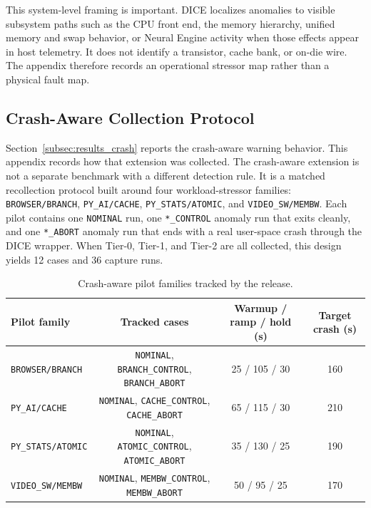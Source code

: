 This system-level framing is important. \textsc{DICE} localizes anomalies to visible subsystem paths such as the CPU front end, the memory hierarchy, unified memory and swap behavior, or Neural Engine activity when those effects appear in host telemetry. It does not identify a transistor, cache bank, or on-die wire. The appendix therefore records an operational stressor map rather than a physical fault map.

\FloatBarrier

\subsection{Crash-Aware Collection Protocol}\label{app:crash_protocol}

Section~\ref{subsec:results_crash} reports the crash-aware warning behavior. This appendix records how that extension was collected. The crash-aware extension is not a separate benchmark with a different detection rule. It is a matched recollection protocol built around four workload-stressor families: \texttt{BROWSER/BRANCH}, \texttt{PY\_AI/CACHE}, \texttt{PY\_STATS/ATOMIC}, and \texttt{VIDEO\_SW/MEMBW}. Each pilot contains one \texttt{NOMINAL} run, one \texttt{*\_CONTROL} anomaly run that exits cleanly, and one \texttt{*\_ABORT} anomaly run that ends with a real user-space crash through the DICE wrapper. When Tier-0, Tier-1, and Tier-2 are all collected, this design yields 12 cases and 36 capture runs.

\begin{table}[!t]
\centering
\caption{Crash-aware pilot families tracked by the release.}
\label{tab:app_crash_pilots}
{\scriptsize
\setlength{\tabcolsep}{2.2pt}
\renewcommand{\arraystretch}{1.02}
\begin{tabular*}{\columnwidth}{@{\extracolsep{\fill}}lccc@{}}
\toprule
Pilot family & Tracked cases & Warmup / ramp / hold (s) & Target crash (s) \\
\midrule
\texttt{BROWSER/BRANCH} & \texttt{NOMINAL}, \texttt{BRANCH\_CONTROL}, \texttt{BRANCH\_ABORT} & 25 / 105 / 30 & 160 \\
\texttt{PY\_AI/CACHE} & \texttt{NOMINAL}, \texttt{CACHE\_CONTROL}, \texttt{CACHE\_ABORT} & 65 / 115 / 30 & 210 \\
\texttt{PY\_STATS/ATOMIC} & \texttt{NOMINAL}, \texttt{ATOMIC\_CONTROL}, \texttt{ATOMIC\_ABORT} & 35 / 130 / 25 & 190 \\
\texttt{VIDEO\_SW/MEMBW} & \texttt{NOMINAL}, \texttt{MEMBW\_CONTROL}, \texttt{MEMBW\_ABORT} & 50 / 95 / 25 & 170 \\
\bottomrule
\end{tabular*}
}
\end{table}

